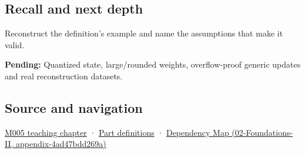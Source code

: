 \subsection{Recall and next depth}\label{recall-and-next-depth}

Reconstruct the definition's example and name the assumptions that make it valid.

\textbf{Pending:} Quantized state, large/rounded weights, overflow-proof generic updates and real reconstruction datasets.

\subsection{Source and navigation}\label{source-and-navigation}

\href{Continuous\%20Notes/Computing\%20Foundations\%20-\%20From\%20Bits\%20to\%20C++\%20and\%20Systems\%20APIs\#When\%20arithmetic\%20meets\%20uncertainty}{M005 teaching chapter} · \hyperref[appendix-fd090d982a15]{Part definitions} · \href{}{Dependency Map (02-Foundations-II, appendix-4ad47bdd269a)}

